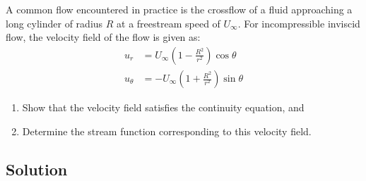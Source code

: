 \section{}
A common flow encountered in practice is the crossflow of a fluid approaching a long cylinder of radius $R$ at a freestream speed of $U_{\infty}$. For incompressible inviscid flow, the velocity field of the flow is given as:
\begin{align}
    u_r &= U_{\infty} \left(1 - \frac{R^2}{r^2}\right)\cos\theta \label{eq:5a} \\
    u_{\theta} &= -U_{\infty} \left(1 + \frac{R^2}{r^2}\right)\sin\theta \label{eq:5b}
\end{align}
\begin{enumerate}[label=(\alph*)]
    \item Show that the velocity field satisfies the continuity equation, and
    \item Determine the stream function corresponding to this velocity field.
\end{enumerate}

\subsection*{Solution}
